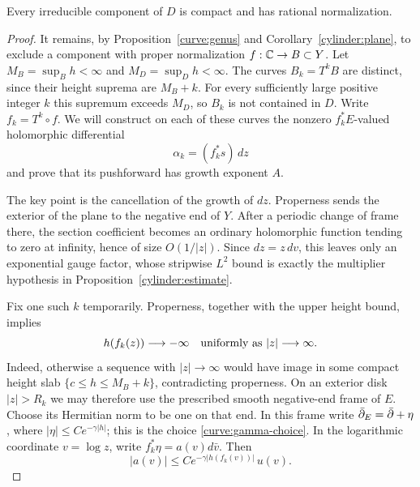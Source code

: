 \begin{theorem}\label{cylinder:compactness}
Every irreducible component of $D$ is compact and has rational
normalization.
\end{theorem}

\begin{proof}
It remains, by Proposition~\ref{curve:genus} and
Corollary~\ref{cylinder:plane}, to exclude a component with proper
normalization $f:\mathbb C\to B\subset Y$.  Let
$M_B=\sup_Bh<\infty$ and $M_D=\sup_Dh<\infty$.
The curves $B_k=T^kB$ are distinct, since their height suprema are
$M_B+k$.  For every sufficiently large positive integer $k$ this
supremum exceeds $M_D$, so $B_k$ is not contained in $D$.
Write $f_k=T^k\circ f$.  We will construct on each of these curves
the nonzero $f_k^*E$-valued holomorphic differential
\begin{equation}\label{cylinder:bundle-differential}
 \alpha_k=(f_k^*s)\,dz
\end{equation}
and prove that its pushforward has growth exponent $A$.

The key point is the cancellation of the growth of $dz$. Properness
sends the exterior of the plane to the negative end of $Y$. After a
periodic change of frame there, the section coefficient becomes an
ordinary holomorphic function tending to zero at infinity, hence of
size $O(1/|z|)$. Since $dz=z\,dv$, this leaves only an exponential
gauge factor, whose stripwise $L^2$ bound is exactly the multiplier
hypothesis in Proposition~\ref{cylinder:estimate}.

Fix one such $k$ temporarily.  Properness, together with the upper
height bound, implies
\begin{equation}\label{cylinder:proper-end}
 h(f_k(z))\longrightarrow-\infty
                  \quad\hbox{uniformly as }|z|\longrightarrow\infty.
\end{equation}
Indeed, otherwise a sequence with $|z|\to\infty$ would have image in
some compact height slab $\{c\leq h\leq M_B+k\}$, contradicting
properness.  On an exterior disk $|z|>R_k$ we may therefore use the
prescribed smooth negative-end frame of $E$.  Choose its Hermitian
norm to be one on that end.  In this frame write
$\bar\partial_E=\bar\partial+\eta$, where
$|\eta|\leq C e^{-\gamma|h|}$; this is the choice
\eqref{curve:gamma-choice}.  In the logarithmic coordinate $v=\log z$,
write $f_k^*\eta=a(v)d\bar v$.  Then
\begin{equation}\label{cylinder:connection-bound}
 |a(v)|\leq C e^{-\gamma|h(f_k(v))|}\,u(v).
\end{equation}


\end{proof}
